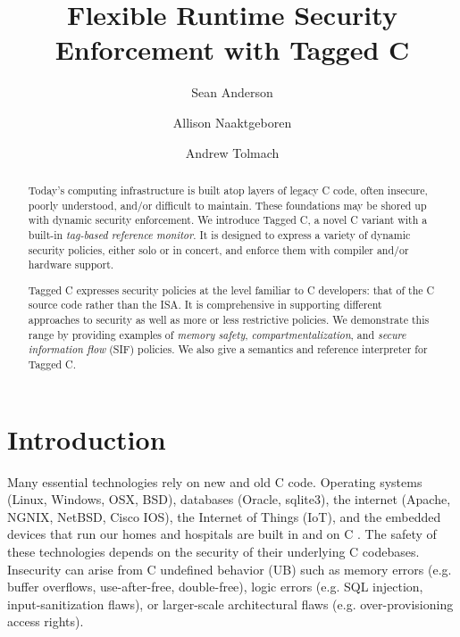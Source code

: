 \documentclass{llncs}
\title{Flexible Runtime Security Enforcement with Tagged C}
\author{Sean Anderson \and Allison Naaktgeboren \and Andrew Tolmach}
\institute{Portland State University}
\begin{document}





\maketitle

\begin{abstract}
Today's computing infrastructure is built atop layers of legacy C code, often
insecure, poorly understood, and/or difficult to maintain.
These foundations may be shored up with dynamic security enforcement.
We introduce Tagged C, a novel C variant with a built-in {\em tag-based reference monitor}.
It is designed to express a variety of dynamic security policies, either solo or in concert,
and enforce them with compiler and/or hardware support.

Tagged C expresses security policies at the level familiar to C developers: that
of the C source code rather than the ISA. It is comprehensive in supporting different
approaches to security as well as more or less restrictive policies. We demonstrate
this range by providing examples of {\em memory safety}, {\em compartmentalization},
and {\em secure information flow} (SIF) policies. We also give a semantics and reference
interpreter for Tagged C.
\end{abstract}

\section{Introduction}
Many essential technologies rely on new and old C code. 
Operating systems (Linux, Windows, OSX, BSD), databases (Oracle, sqlite3), the internet
(Apache, NGNIX, NetBSD, Cisco IOS), the Internet of Things (IoT), and the 
embedded devices that run our homes and hospitals are built in and on C \cite{Munoz:PoweredbyC}. 
The safety of these technologies
depends on the security of their underlying C codebases.
Insecurity can arise from C
undefined behavior (UB) such as memory errors (e.g. buffer overflows, use-after-free, double-free),
logic errors (e.g. SQL injection, input-sanitization flaws), or
larger-scale architectural flaws (e.g. over-provisioning access rights).
\end{document}
